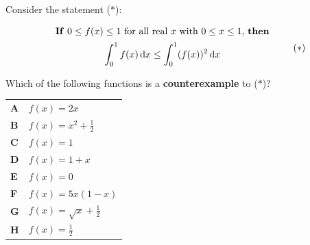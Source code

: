 \documentclass[11pt,a4paper]{article}
\begin{document}
\begin{enumerate}[label=\textbf{\arabic*.},leftmargin=*,itemsep=0pt,start=9]
\questionitem[Logic]
Consider the statement ($\ast$):

\[ \begin{array}{c}
\text{\textbf{If} $0 \le f(x) \le 1$ for all real $x$ with $0 \le x \le 1$, \textbf{then}}\\[5pt]

\text{$\displaystyle\int_0^1 f(x)\,\mathrm{d}x \le \int_0^1 (f(x))^2\,\mathrm{d}x$} \\[10pt]
\end{array} \tag{$\ast$} \] Which of the following functions is a \textbf{counterexample} to ($\ast$)?

\par\vspace*{12pt}
\begin{tabularx}{\linewidth}{@{}>{\bfseries}l Y@{}}
A &
$f(x)=2x$
\\[0.8em]
B &
$f(x)=x^2+\frac{1}{2}$
\\[0.8em]
C &
$f(x)=1$
\\[0.8em]
D &
$f(x)=1+x$
\\[0.8em]
E &
$f(x)=0$
\\[0.8em]
F &
$f(x)=5x(1-x)$
\\[0.8em]
G &
$f(x)=\sqrt{x}+\frac{1}{2}$
\\[0.8em]
H &
$f(x)=\frac12$
\\
\end{tabularx}
\end{enumerate}
\clearpage
\thispagestyle{djspaper}
\vspace*{8pt}
\end{document}
